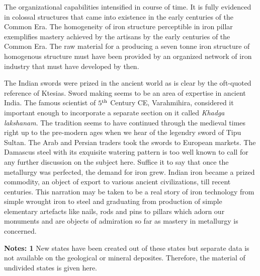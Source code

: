 The organizational capabilities intensified in course of time. It is fully evidenced in colossal structures that came into existence in the early centuries of the Common Era. The homogeneity of iron structure perceptible in iron pillar exemplifies mastery achieved by the artisans by the early centuries of the Common Era. The raw material for a producing a seven tonne iron structure of homogenous structure must have been provided by an organized network of iron industry that must have developed by then.

The Indian swords were prized in the ancient world as is clear by the oft-quoted reference of Ktesias. Sword making seems to be an area of expertise in ancient India. The famous scientist of $5^{\rm th}$ Century CE, Varahmihira, considered it important enough to incorporate a separate section on it called {\it Khadga lakshanam}. The tradition seems to have continued through the medieval times right up to the pre-modern ages when we hear of the legendry sword of Tipu Sultan. The Arab and Persian traders took the swords to European markets. The Damascus steel with its exquisite watering pattern is too well known to call for any further discussion on the subject here. Suffice it to say that once the metallurgy was perfected, the demand for iron grew. Indian iron became a prized commodity, an object of export to various ancient civilizations, till recent centuries. This narration may be taken to be a real story of iron technology from simple wrought iron to steel and graduating from production of simple elementary artefacts like nails, rods and pins to pillars which adorn our monuments and are objects of admiration so far as mastery in metallurgy is concerned. 

\textbf{Notes: 1} New states have been created out of these states but separate data is not available on the geological or mineral deposites. Therefore, the material of undivided states is given here.

\newpage

